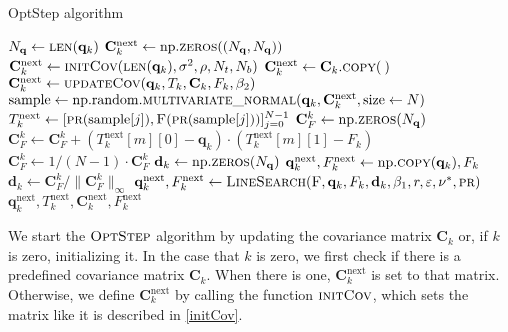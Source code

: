 \begin{algorithm}[H]%
\caption{\label{OptStep}OptStep algorithm}
\begin{algorithmic}[1]
\State $N_\mathbf{q}\gets\Call{len}{\mathbf{q}_k}$
\State $\mathbf{C}^\mathrm{next}_k \gets \mathrm{np.}\Call{zeros}{(N_\mathbf{q}, N_\mathbf{q})}$
\State $\mathbf{C}^\mathrm{next}_k \gets \Call{initCov}{\protect\Call{len}{\mathbf{q}_k}, \sigma^2, \rho, N_t, N_b}$
\Else
\State $\mathbf{C}^\mathrm{next}_k \gets \mathbf{C}_k.\Call{copy}{\:}$
\EndIf
\Else
\State $\mathbf{C}^\mathrm{next}_k \gets \Call{updateCov}{\mathbf{q}_k, T_k, \mathbf{C}_k, F_k ,\beta_2}$
\EndIf
\State $\mathrm{sample} \gets \mathrm{np.random.}\Call{multivariate\_normal}{\mathbf{q}_k, \mathbf{C}^\mathrm{next}_k, \mathrm{size} \gets N}$
\State $T^\mathrm{next}_k\gets[\Call{pr}{\mathrm{sample}[j]},\Call{F}{\protect\Call{pr}{\mathrm{sample}[j]}}]_{j=0}^{N-1}$
\State $\mathbf{C}^k_F \gets \mathrm{np.}\Call{zeros}{N_\mathbf{q}}$
\State $\mathbf{C}^k_F \gets \mathbf{C}^k_F+(T^\mathrm{next}_k[m][0]-\mathbf{q}_k)\cdot(T^\mathrm{next}_k[m][1]-F_k)$
\EndFor
\State $\mathbf{C}^k_F \gets 1/(N-1)\cdot\mathbf{C}^k_F$
\State $\mathbf{d}_k \gets \mathrm{np.}\Call{zeros}{N_\mathbf{q}}$
\State $\mathbf{q}^\mathrm{next}_{k}, F^\mathrm{next}_k \gets \mathrm{np.}\Call{copy}{\mathbf{q}_k},F_k$
\State $\mathbf{d}_k \gets \mathbf{C}^k_F/\|\mathbf{C}^k_F\|_\infty$
\State $\mathbf{q}^\mathrm{next}_{k}, F^\mathrm{next}_k \gets \Call{LineSearch}{\textproc{F},\mathbf{q}_k,F_k,\mathbf{d}_k,\beta_1,r,\varepsilon,\nu^*,\textproc{pr}}$
\EndIf
\State \Return $\mathbf{q}^\mathrm{next}_k,T^\mathrm{next}_k,\mathbf{C}^\mathrm{next}_k,F^\mathrm{next}_k$
\EndFunction
\end{algorithmic}
\end{algorithm}

We start the $\textproc{OptStep}$ algorithm by updating the covariance matrix $\mathbf{C}_k$ or, if $k$ is zero, initializing it. In the case that $k$ is zero, we first check if there is a predefined covariance matrix $\mathbf{C}_k$. When there is one, $\mathbf{C}^\mathrm{next}_k$ is set to that matrix. Otherwise, we define $\mathbf{C}^\mathrm{next}_k$ by calling the function $\textproc{initCov}$, which sets the matrix like it is described in \eqref{initCov}.

